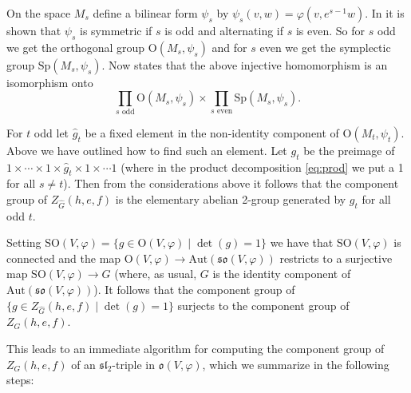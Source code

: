 \documentclass[a4paper,10pt]{amsart}
\newcommand{\Sp}{\mathrm{Sp}}
\newcommand{\mf}{\mathfrak}
\newcommand{\so}{\mf{so}}
\newcommand{\ssl}{\mf{sl}}
\renewcommand{\o}{\mf{o}}
\renewcommand{\O}{\mathrm{O}}
\newcommand{\SO}{\mathrm{SO}}
\renewcommand{\Sp}{\mathrm{Sp}}
\newcommand{\Aut}{\mathrm{Aut}}
\newcommand{\wG}{\widehat{G}}
\numberwithin{equation}{section}
\theoremstyle{remark}
\theoremstyle{remark}
\begin{document}
On the space $M_s$ define a bilinear form $\psi_s$ by $\psi_s(v,w) =
\varphi(v,e^{s-1}w)$. In \cite[\S 3.7]{jannilp} it is shown that $\psi_s$ is
symmetric if $s$ is odd and alternating if $s$ is even. So for $s$ odd we
get the orthogonal group $\O(M_s,\psi_s)$ and for $s$ even we get the
symplectic group $\Sp(M_s,\psi_s)$. Now \cite[\S 3.8, Proposition 2]{jannilp}
states that the above injective homomorphism is an isomorphism onto
\begin{equation}\label{eq:prod}
\prod_{s \text{ odd}} \O(M_s,\psi_s) \times \prod_{s \text{ even}} \Sp(M_s,\psi_s).
\end{equation}  

For $t$ odd let $\hat g_t$ be a fixed element in the non-identity component
of $\O(M_t,\psi_t)$. Above we have outlined how to find such an element.
Let $g_t$ be the preimage of $1\times \cdots \times 1 \times \hat g_t \times 1
\times \cdots 1$ (where in the product decomposition \eqref{eq:prod} we
put a 1 for all $s\neq t$). Then from the considerations above it follows that
the component group of $Z_{\wG}(h,e,f)$ is the elementary abelian 2-group
generated by $g_t$ for all odd $t$.

Setting $\SO(V,\varphi) = \{g\in \O(V,\varphi) \mid \det(g)=1\}$ we
have that $\SO(V,\varphi)$ is connected and the map $\O(V,\varphi)\to \Aut(
\so(V,\varphi))$ restricts to a surjective map $\SO(V,\varphi) \to G$
(where, as usual, $G$ is the identity component of $\Aut(\so(V,\varphi))$).
It follows that the component group of $\{ g\in Z_{\wG}(h,e,f) \mid \det(g)=1\}$
surjects to the component group of $Z_{G}(h,e,f)$.

This leads to an immediate algorithm for computing the component group of
$Z_G(h,e,f)$ of an $\ssl_2$-triple in $\o(V,\varphi)$, which we summarize
in the following steps:
\end{document}
